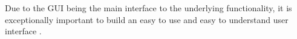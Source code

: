 Due to the GUI being the main interface to the underlying functionality, it is exceptionally important to build an easy to use and easy to understand user interface \parencite[cf.][2]{Dray.1995}.


